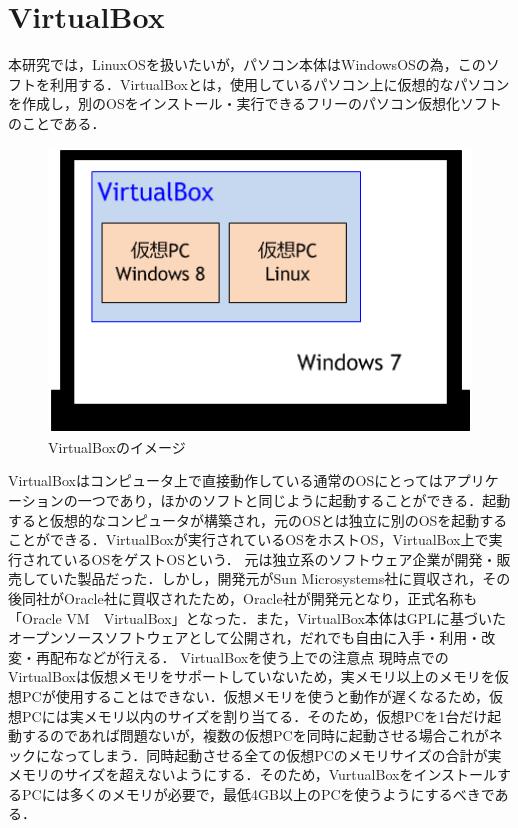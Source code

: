 \newpage

\section{VirtualBox}
本研究では，LinuxOSを扱いたいが，パソコン本体はWindowsOSの為，このソフトを利用する．VirtualBoxとは，使用しているパソコン上に仮想的なパソコンを作成し，別のOSをインストール・実行できるフリーのパソコン仮想化ソフトのことである．

\begin{figure}[htb]
\centering
\includegraphics[width=12cm]{virtualbox.png}
\caption{VirtualBoxのイメージ}\label{サンプル図}
\end{figure}
VirtualBoxはコンピュータ上で直接動作している通常のOSにとってはアプリケーションの一つであり，ほかのソフトと同じように起動することができる．起動すると仮想的なコンピュータが構築され，元のOSとは独立に別のOSを起動することができる．VirtualBoxが実行されているOSをホストOS，VirtualBox上で実行されているOSをゲストOSという．
元は独立系のソフトウェア企業が開発・販売していた製品だった．しかし，開発元がSun Microsystems社に買収され，その後同社がOracle社に買収されたため，Oracle社が開発元となり，正式名称も「Oracle VM　VirtualBox」となった．また，VirtualBox本体はGPLに基づいたオープンソースソフトウェアとして公開され，だれでも自由に入手・利用・改変・再配布などが行える．
VirtualBoxを使う上での注意点
現時点でのVirtualBoxは仮想メモリをサポートしていないため，実メモリ以上のメモリを仮想PCが使用することはできない．仮想メモリを使うと動作が遅くなるため，仮想PCには実メモリ以内のサイズを割り当てる．そのため，仮想PCを1台だけ起動するのであれば問題ないが，複数の仮想PCを同時に起動させる場合これがネックになってしまう．同時起動させる全ての仮想PCのメモリサイズの合計が実メモリのサイズを超えないようにする．そのため，VurtualBoxをインストールするPCには多くのメモリが必要で，最低4GB以上のPCを使うようにするべきである．

